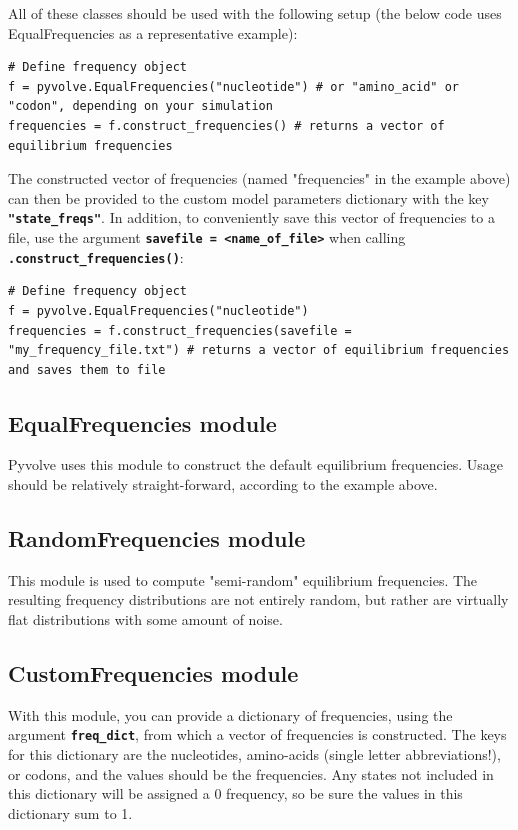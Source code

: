 \documentclass{article}
\newcommand{\code}[1]{\textbf{\texttt{\small{#1}}}}
\begin{document}
All of these classes should be used with the following setup (the below code uses EqualFrequencies as a representative example):
\begin{lstlisting}
# Define frequency object
f = pyvolve.EqualFrequencies("nucleotide") # or "amino_acid" or "codon", depending on your simulation
frequencies = f.construct_frequencies() # returns a vector of equilibrium frequencies
\end{lstlisting}

The constructed vector of frequencies (named "frequencies" in the example above) can then be provided to the custom model parameters dictionary with the key \code{"state\_freqs"}. In addition, to conveniently save this vector of frequencies to a file, use the argument \code{savefile = <name\_of\_file>} when calling \code{.construct\_frequencies()}:
\begin{lstlisting}
# Define frequency object
f = pyvolve.EqualFrequencies("nucleotide")
frequencies = f.construct_frequencies(savefile = "my_frequency_file.txt") # returns a vector of equilibrium frequencies and saves them to file
\end{lstlisting}


\subsection{EqualFrequencies module}
Pyvolve uses this module to construct the default equilibrium frequencies. Usage should be relatively straight-forward, according to the example above.

\subsection{RandomFrequencies module}
This module is used to compute "semi-random" equilibrium frequencies. The resulting frequency distributions are not entirely random, but rather are virtually flat distributions with some amount of noise.

\subsection{CustomFrequencies module}
With this module, you can provide a dictionary of frequencies, using the argument \code{freq\_dict}, from which a vector of frequencies is constructed. The keys for this dictionary are the nucleotides, amino-acids (single letter abbreviations!), or codons, and the values should be the frequencies. Any states not included in this dictionary will be assigned a 0 frequency, so be sure the values in this dictionary sum to 1.
\end{document}
